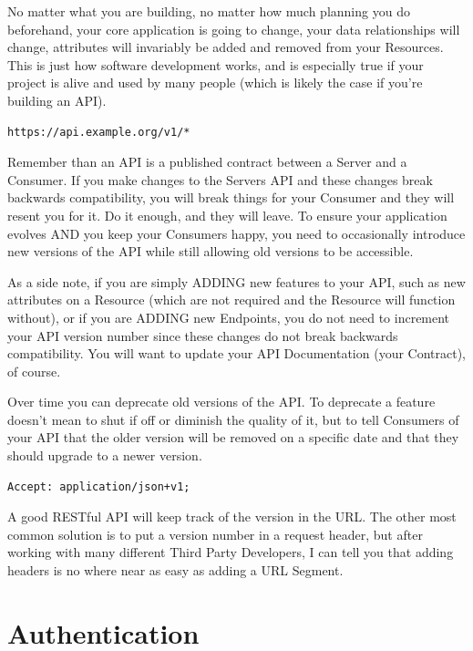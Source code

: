 \documentclass{book}
\begin{document}
No matter what you are building, no matter how much planning you do beforehand, your core application is going to change, your data relationships will change, attributes will invariably be added and removed from your Resources. This is just how software development works, and is especially true if your project is alive and used by many people (which is likely the case if you're building an API).

\begin{verbatim}
https://api.example.org/v1/*
\end{verbatim}

Remember than an API is a published contract between a Server and a Consumer. If you make changes to the Servers API and these changes break backwards compatibility, you will break things for your Consumer and they will resent you for it. Do it enough, and they will leave. To ensure your application evolves AND you keep your Consumers happy, you need to occasionally introduce new versions of the API while still allowing old versions to be accessible.

As a side note, if you are simply ADDING new features to your API, such as new attributes on a Resource (which are not required and the Resource will function without), or if you are ADDING new Endpoints, you do not need to increment your API version number since these changes do not break backwards compatibility. You will want to update your API Documentation (your Contract), of course.

Over time you can deprecate old versions of the API. To deprecate a feature doesn't mean to shut if off or diminish the quality of it, but to tell Consumers of your API that the older version will be removed on a specific date and that they should upgrade to a newer version.

\begin{verbatim}
Accept: application/json+v1;
\end{verbatim}

A good RESTful API will keep track of the version in the URL. The other most common solution is to put a version number in a request header, but after working with many different Third Party Developers, I can tell you that adding headers is no where near as easy as adding a URL Segment.


\section{Authentication}
\end{document}
